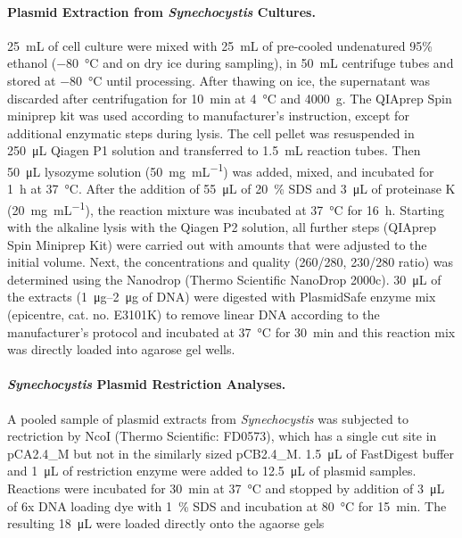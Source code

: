 \documentclass[10pt,a4]{article}
\newcommand{\mL}{\milli\liter}
\newcommand{\scyst}{\textit{Synechocystis}}
\begin{document}
\paragraph{Plasmid Extraction from \scyst{} Cultures.}
\SI{25}{\mL} of cell culture were mixed with \SI{25}{\mL} of
pre-cooled undenatured 95\% ethanol (\SI{-80}{\celsius} and on dry ice
during sampling), in \SI{50}{\mL} centrifuge tubes and stored at
\SI{-80}{\celsius} until processing. After thawing on ice, the
supernatant was discarded after centrifugation for \SI{10}{\minute} at
\SI{4}{\celsius} and \SI{4000}{g}. The QIAprep Spin miniprep kit was
used according to manufacturer's instruction, except for additional
enzymatic steps during lysis. The cell pellet was resuspended in
\SI{250}{\micro\liter} Qiagen P1 solution and transferred to
\SI{1.5}{\mL} reaction tubes. Then \SI{50}{\micro\liter} lysozyme
solution (\SI{50}{\milli\gram\per\milli\liter}) was added, mixed, and
incubated for \SI{1}{\hour} at \SI{37}{\celsius}.  After the addition
of \SI{55}{\micro\liter} of \SI{20}{\percent} SDS and
\SI{3}{\micro\liter} of proteinase K
(\SI{20}{\milli\gram\per\milli\liter}), the reaction mixture was
incubated at \SI{37}{\celsius} for \SI{16}{\hour}.  Starting with the
alkaline lysis with the Qiagen P2 solution, all further steps (QIAprep
Spin Miniprep Kit) were carried out with amounts that were adjusted to
the initial volume. Next, the concentrations and quality (260/280,
230/280 ratio) was determined using the Nanodrop (Thermo Scientific
NanoDrop 2000c).  \SI{30}{\uL} of the extracts (\SIrange{1}{2}{\ug} of
DNA) were digested with PlasmidSafe enzyme mix (epicentre,
cat. no. E3101K) to remove linear DNA according to the manufacturer's
protocol and incubated at \SI{37}{\celsius} for \SI{30}{\minute} and
this reaction mix was directly loaded into agarose gel wells.


\paragraph{\scyst{} Plasmid Restriction Analyses.}
A pooled sample of plasmid extracts from \scyst{} was subjected to
rectriction by NcoI (Thermo Scientific: FD0573), which has a single
cut site in pCA2.4\_M but not in the similarly sized pCB2.4\_M.
\SI{1.5}{\uL} of FastDigest buffer and \SI{1}{\uL} of restriction
enzyme were added to \SI{12.5}{\uL} of plasmid samples. Reactions were
incubated for \SI{30}{\minute} at \SI{37}{\celsius} and stopped by
addition of \SI{3}{\uL} of 6x DNA loading dye with \SI{1}{\percent}
SDS and incubation at \SI{80}{\celsius} for \SI{15}{\minute}. The
resulting \SI{18}{\uL} were loaded directly onto the agaorse gels
\end{document}
